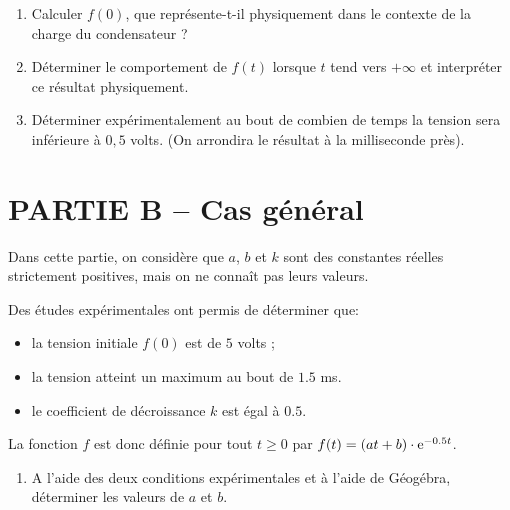 \begin{enumerate}[series=monDS, resume]
    \item Calculer $f(0)$, que représente-t-il physiquement dans le contexte de la charge du condensateur ?
    \begin{blocvisiblex}[height=2]
    {\quad}
    \end{blocvisiblex}
    \medskip
    \item Déterminer le comportement de $f(t)$ lorsque $t$ tend vers $+\infty$ et interpréter ce résultat physiquement.
    \begin{blocvisiblex}[height=2]
    {\quad}
    \end{blocvisiblex}
    \medskip
    \item Déterminer expérimentalement au bout de combien de temps la tension sera inférieure à $0,5$ volts. (On arrondira le résultat à la milliseconde près).
    \begin{blocvisiblex}[height=1]
    {\quad}
    \end{blocvisiblex}
\end{enumerate}

\bigskip

\section*{PARTIE B -- Cas général}

Dans cette partie, on considère que $a$, $b$ et $k$ sont des constantes réelles strictement positives, mais on ne connaît pas leurs valeurs.

Des études expérimentales ont permis de déterminer que:
\begin{itemize}
    \item la tension initiale $f(0)$ est de $5$ volts ;
    \item la tension atteint un maximum au bout de $1.5$ ms.
    \item le coefficient de décroissance $k$ est égal à $0.5$.
\end{itemize}

La fonction $f$ est donc définie pour tout $t\geq 0$ par $f(t)=(at+b)\cdot \mathrm{e}^{-0.5t}$.

\pagebreak

\begin{enumerate}[series=monDS, resume]
    \item A l'aide des deux conditions expérimentales et à l'aide de Géogébra, déterminer les valeurs de $a$ et $b$.
    \begin{blocvisiblex}[height=1]
    {\quad}
    \end{blocvisiblex}
    \appelprof{}
\end{enumerate}

